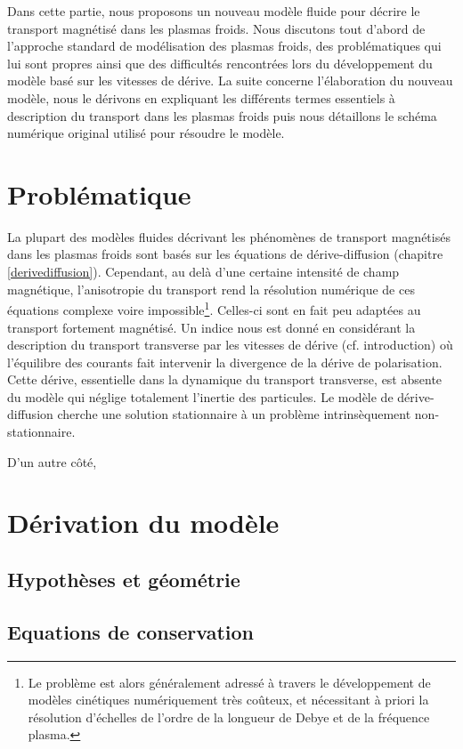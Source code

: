 Dans cette partie, nous proposons un nouveau modèle fluide pour décrire le
transport magnétisé dans les plasmas froids. Nous discutons tout d'abord de
l'approche standard de modélisation des plasmas froids, des problématiques qui
lui sont propres ainsi que des difficultés rencontrées lors du développement du
modèle basé sur les vitesses de dérive. La suite concerne l'élaboration du
nouveau modèle, nous le dérivons en expliquant les différents
termes essentiels à description du transport dans les plasmas froids puis nous
détaillons le schéma numérique original utilisé pour résoudre le modèle.
\section{Problématique}
La plupart des modèles fluides décrivant les phénomènes de transport
magnétisés dans les plasmas froids sont basés sur les équations de
dérive-diffusion (chapitre \ref{derivediffusion}). Cependant, au delà d'une
certaine intensité de champ magnétique, l'anisotropie du transport rend la résolution
numérique de ces équations complexe voire impossible\footnote{Le problème est alors
généralement adressé à travers le développement de
modèles cinétiques numériquement très coûteux, et nécessitant à priori la
résolution d'échelles de l'ordre de la longueur de Debye et de la fréquence plasma.}. 
Celles-ci sont en fait peu adaptées au transport fortement magnétisé. 
Un indice nous est donné en considérant la
description du transport transverse par les vitesses de dérive (cf.
introduction) où l'équilibre des courants fait intervenir la divergence de
la dérive de polarisation. Cette dérive, essentielle dans la dynamique du transport 
transverse, est absente du modèle qui néglige totalement l'inertie des particules. Le modèle de
dérive-diffusion cherche une solution stationnaire à un problème intrinsèquement non-stationnaire.

D'un autre côté, 

\section{Dérivation du modèle}
\subsection{Hypothèses et géométrie}
\subsection{Equations de conservation}
